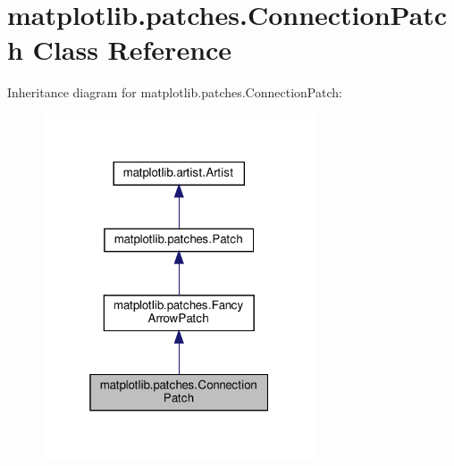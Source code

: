 \hypertarget{classmatplotlib_1_1patches_1_1ConnectionPatch}{}\section{matplotlib.\+patches.\+Connection\+Patch Class Reference}
\label{classmatplotlib_1_1patches_1_1ConnectionPatch}


Inheritance diagram for matplotlib.\+patches.\+Connection\+Patch\+:
\nopagebreak
\begin{figure}[H]
\begin{center}
\leavevmode
\includegraphics[width=229pt]{classmatplotlib_1_1patches_1_1ConnectionPatch__inherit__graph}
\end{center}
\end{figure}


